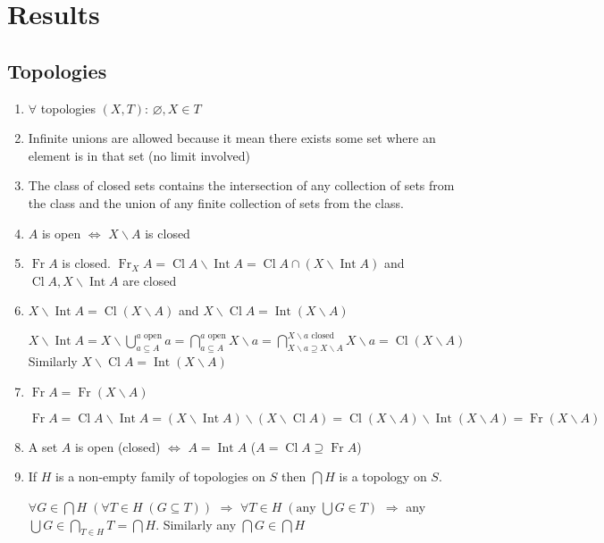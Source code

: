\documentclass{article}
\DeclareMathOperator{\Int}{Int}
\DeclareMathOperator{\Cl}{Cl}
\DeclareMathOperator{\Fr}{Fr}
\begin{document}
\section{Results}
\subsection{Topologies}
\begin{enumerate}
\item\(\forall\) topologies \((X,T)\): \(\varnothing,X\in T\)
\item Infinite unions are allowed because it mean there exists some set where an element is in that set (no limit involved)
\item The class of closed sets contains the intersection of any collection of sets from the class and the union of any finite collection of sets from the class.
\item \(A\) is open \(\Longleftrightarrow\) \(X\backslash A\) is closed
\item \(\Fr A\) is closed.
\(\Fr_{X} A=\Cl A\backslash\Int A=\Cl A\cap(X\backslash\Int A)\) and \(\Cl A,X\backslash\Int A\) are closed
\item \(X\backslash\Int A=\Cl(X\backslash A)\) and \(X\backslash \Cl A=\Int (X\backslash A)\)

\(X\backslash\Int A=X\backslash\bigcup_{a\subseteq A}^{a \text{ open}}a=\bigcap_{a\subseteq A}^{a \text{ open}}X\backslash a=\bigcap_{X\backslash a\supseteq X\backslash A}^{X\backslash a \text{ closed}}X\backslash a=\Cl(X\backslash A)\) Similarly \(X\backslash \Cl A=\Int (X\backslash A)\)
\item \(\Fr A=\Fr(X\backslash A)\)

\(\Fr A=\Cl A\backslash\Int A=(X\backslash\Int A)\backslash(X\backslash\Cl A)=\Cl(X\backslash A)\backslash\Int(X\backslash A)=\Fr(X\backslash A)\)
\item A set \(A\) is open (closed) \(\Longleftrightarrow\) \(A=\Int A\) (\(A=\Cl A\supseteq \Fr A\))
\item If \(H\) is a non-empty family of topologies on \(S\) then \(\bigcap H\) is a topology on \(S\).

\(\forall G\in\bigcap H\;(\forall T\in H\;(G\subseteq T))\) \(\Longrightarrow\) \(\forall T\in H\;(\text{any }\bigcup G\in T)\) \(\Longrightarrow\) any \(\bigcup G\in\bigcap_{T\in H}T=\bigcap H\). Similarly any \(\bigcap G\in\bigcap H\)
\end{enumerate}
\end{document}
